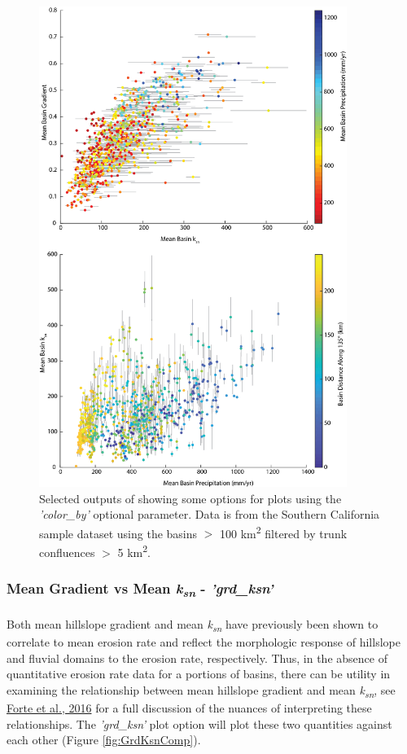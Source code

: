\begin{figure}[H]
	\centering
	\includegraphics[width=10cm]{PNGs/BasinStats.png}
	\caption{Selected outputs of  showing some options for plots using the \textit{'color\_by'} optional parameter. Data is from the Southern California sample dataset using the basins $>$ 100 km\textsuperscript{2}  filtered by trunk confluences $>$ 5 km\textsuperscript{2}.}
	\label{fig:BsnSts}
\end{figure}

\subsubsection{Mean Gradient vs Mean \textit{k\textsubscript{sn}} - \textit{'grd\_ksn'}} \label{sec:grdksn}
\paragraph{}Both mean hillslope gradient and mean \textit{k\textsubscript{sn}} have previously been shown to correlate to mean erosion rate  and reflect the morphologic response of hillslope and fluvial domains to the erosion rate, respectively. Thus, in the absence of quantitative erosion rate data for a portions of basins, there can be utility in examining the relationship between mean hillslope gradient and mean \textit{k\textsubscript{sn}}, see \href{https://www.sciencedirect.com/science/article/pii/S0012821X16303004}{Forte et al., 2016} for a full discussion of the nuances of interpreting these relationships. The \textit{'grd\_ksn'} plot option will plot these two quantities against each other (Figure \ref{fig:GrdKsnComp}). 


